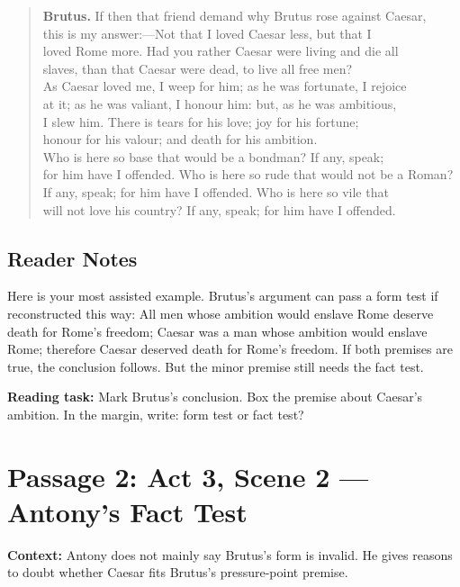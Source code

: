\documentclass[12pt]{article}
\newenvironment{playpassage}{\begin{quote}\small\setlength{\parskip}{0.18em}\setlength{\parindent}{0pt}}{\end{quote}}
\newcommand{\speaker}[1]{\textbf{#1.}}
\begin{document}
\begin{playpassage}
\speaker{Brutus} If then that friend demand why Brutus rose against Caesar,\\
this is my answer:---Not that I loved Caesar less, but that I\\
loved Rome more. Had you rather Caesar were living and die all\\
slaves, than that Caesar were dead, to live all free men?\\
As Caesar loved me, I weep for him; as he was fortunate, I rejoice\\
at it; as he was valiant, I honour him: but, as he was ambitious,\\
I slew him. There is tears for his love; joy for his fortune;\\
honour for his valour; and death for his ambition.\\
Who is here so base that would be a bondman? If any, speak;\\
for him have I offended. Who is here so rude that would not be a Roman?\\
If any, speak; for him have I offended. Who is here so vile that\\
will not love his country? If any, speak; for him have I offended.
\end{playpassage}

\subsection*{Reader Notes}

Here is your most assisted example. Brutus's argument can pass a form test if reconstructed this way: All men whose ambition would enslave Rome deserve death for Rome's freedom; Caesar was a man whose ambition would enslave Rome; therefore Caesar deserved death for Rome's freedom. If both premises are true, the conclusion follows. But the minor premise still needs the fact test.

\textbf{Reading task:} Mark Brutus's conclusion. Box the premise about Caesar's ambition. In the margin, write: form test or fact test?

\newpage

\section*{Passage 2: Act 3, Scene 2 --- Antony's Fact Test}

\textbf{Context:} Antony does not mainly say Brutus's form is invalid. He gives reasons to doubt whether Caesar fits Brutus's pressure-point premise.
\end{document}
